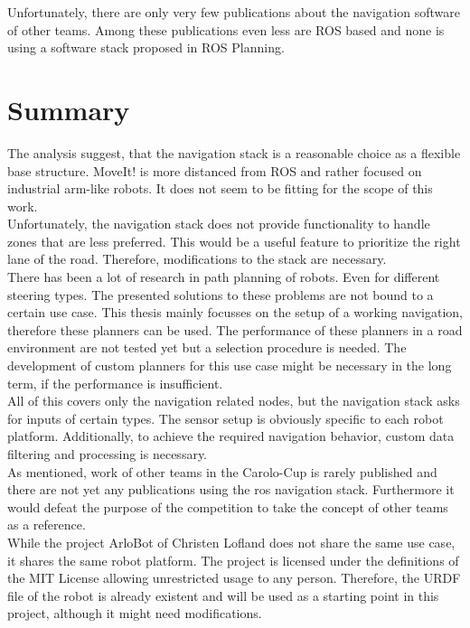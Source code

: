 Unfortunately, there are only very few publications about the navigation software of other teams. Among these publications even less are ROS based and none is using a software stack proposed in ROS Planning.


\section{Summary}
The analysis suggest, that the navigation stack is a reasonable choice as a flexible base structure. MoveIt! is more distanced from ROS and rather focused on industrial arm-like robots. It does not seem to be fitting for the scope of this work.\\

Unfortunately, the navigation stack does not provide functionality to handle zones that are less preferred. This would be a useful feature to prioritize the right lane of the road. Therefore, modifications to the stack are necessary.\\


There has been a lot of research in path planning of robots. Even for different steering types. The presented solutions to these problems are not bound to a certain use case.
This thesis mainly focusses on the setup of a working navigation, therefore these planners can be used. The performance of these planners in a road environment are not tested yet but a selection procedure is needed. The development of custom planners for this use case might be necessary in the long term, if the performance is insufficient.\\

All of this covers only the navigation related nodes, but the navigation stack asks for inputs of certain types. The sensor setup is obviously specific to each robot platform. Additionally, to achieve the required navigation behavior, custom data filtering and processing is necessary.\\

As mentioned, work of other teams in the Carolo-Cup is rarely published and there are not yet any publications using the ros navigation stack. Furthermore it would defeat the purpose of the competition to take the concept of other teams as a reference.\\

While the project ArloBot of Christen Lofland does not share the same use case, it shares the same robot platform. The project is licensed under the definitions of the MIT License allowing unrestricted usage to any person. Therefore, the URDF file of the robot is already existent and will be used as a starting point in this project, although it might need modifications.












